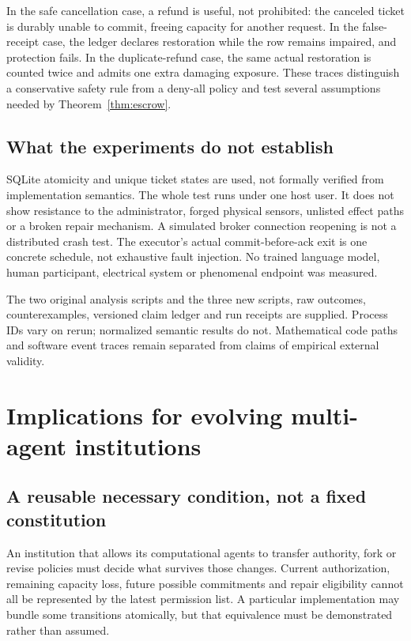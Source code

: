 In the safe cancellation case, a refund is useful, not prohibited: the canceled ticket is durably unable to commit, freeing capacity for another request. In the false-receipt case, the ledger declares restoration while the row remains impaired, and protection fails. In the duplicate-refund case, the same actual restoration is counted twice and admits one extra damaging exposure. These traces distinguish a conservative safety rule from a deny-all policy and test several assumptions needed by Theorem~\ref{thm:escrow}.

\subsection{What the experiments do not establish}
SQLite atomicity and unique ticket states are used, not formally verified from implementation semantics. The whole test runs under one host user. It does not show resistance to the administrator, forged physical sensors, unlisted effect paths or a broken repair mechanism. A simulated broker connection reopening is not a distributed crash test. The executor's actual commit-before-ack exit is one concrete schedule, not exhaustive fault injection. No trained language model, human participant, electrical system or phenomenal endpoint was measured.

The two original analysis scripts and the three new scripts, raw outcomes, counterexamples, versioned claim ledger and run receipts are supplied. Process IDs vary on rerun; normalized semantic results do not. Mathematical code paths and software event traces remain separated from claims of empirical external validity.

\section{Implications for evolving multi-agent institutions}
\subsection{A reusable necessary condition, not a fixed constitution}
An institution that allows its computational agents to transfer authority, fork or revise policies must decide what survives those changes. Current authorization, remaining capacity loss, future possible commitments and repair eligibility cannot all be represented by the latest permission list. A particular implementation may bundle some transitions atomically, but that equivalence must be demonstrated rather than assumed.

